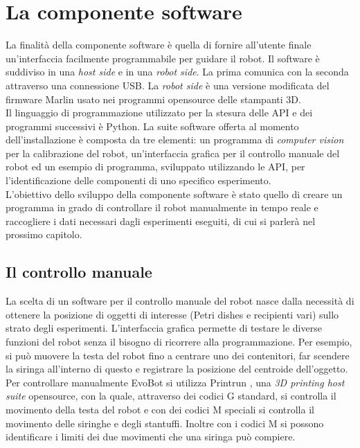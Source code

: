\section{La componente software}
\label{sec:123} 
La finalità della componente software è quella di fornire all'utente finale un'interfaccia facilmente programmabile per guidare il robot. Il software è suddiviso in una \emph{host side} e in una \emph{robot side}. La prima comunica con la seconda attraverso una connessione USB. La \emph{robot side} è una versione modificata del firmware Marlin usato nei programmi opensource delle stampanti 3D. 
\\Il linguaggio di programmazione utilizzato per la stesura delle API e dei programmi successivi è Python. La suite software offerta al momento dell'installazione è composta da tre elementi:
un programma di \emph{computer vision} per la calibrazione del robot, un'interfaccia grafica per il controllo manuale del robot ed un esempio di programma, sviluppato utilizzando le API, per l'identificazione delle componenti di uno specifico esperimento.
\\L'obiettivo dello sviluppo della componente software è stato quello di creare un programma in grado di controllare il robot manualmente in tempo reale e raccogliere i dati necessari dagli esperimenti eseguiti, di cui si parlerà nel prossimo capitolo. 

\subsection{Il controllo manuale}
\label{sec:00123}
La scelta di un software per il controllo manuale del robot nasce dalla necessità di ottenere la posizione di oggetti di interesse (Petri dishes e recipienti vari) sullo strato degli esperimenti. L'interfaccia grafica permette di testare le diverse funzioni del robot senza il bisogno di ricorrere alla programmazione. Per esempio, si può muovere la testa del robot fino a centrare uno dei contenitori, far scendere la siringa all'interno di questo e registrare la posizione del centroide dell'oggetto. 
\\Per controllare manualmente EvoBot si utilizza Printrun \cite{printrun}, una \emph{3D printing host suite}  opensource, con la quale, attraverso dei codici G standard, si controlla il movimento della testa del robot e con dei codici M speciali si controlla il movimento delle siringhe e degli stantuffi. Inoltre con i codici M si possono identificare i limiti dei due movimenti che una siringa può compiere.


